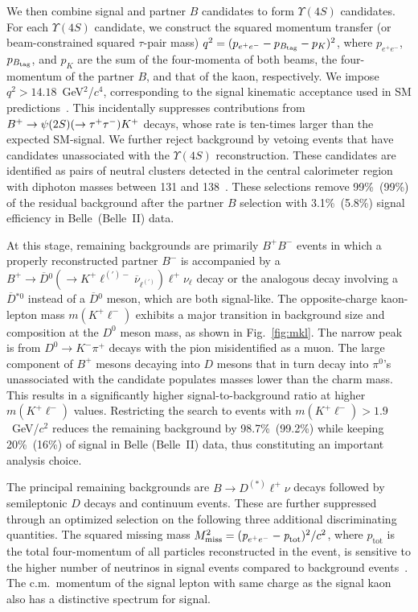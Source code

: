 We then combine signal and partner $B$ candidates to form $\Upsilon(4S)$ candidates. For each $\Upsilon(4S)$ candidate, we construct the squared momentum transfer (or beam-constrained squared $\tau$-pair mass) $q^2 = (p_{e^+e^-} - p_{B_{\rm tag}} -p_K)^2$, where $p_{{e^+e^-}}$, $p_{{ B_{\rm tag}}}$, and  $p_{{K}}$ are the sum of the four-momenta of both beams, the four-momentum of the partner $B$, and that of the kaon, respectively. We impose $q^2 > 14.18$~GeV$^2$/$c^4$, corresponding to the signal kinematic acceptance used in SM predictions~\cite{Bouchard:2013mia}. This incidentally suppresses  contributions from $B^+ \rightarrow \psi(2S) (\rightarrow \tau^+\tau^-) K^+$ decays, whose rate is ten-times larger than the expected SM-signal. We further reject background by vetoing events that have \piz candidates  unassociated with the $\Upsilon(4S)$ reconstruction. These candidates are identified as pairs of neutral clusters detected in the central calorimeter region with diphoton masses between 131 and 138~\mevcc. These selections remove 99\%~(99\%) of the residual background after the partner $B$ selection with 3.1\%~(5.8\%) signal efficiency in Belle~(Belle~II) data.


At this stage, remaining backgrounds are primarily $B^+B^-$ events in which a properly reconstructed partner $B^-$ is accompanied by a $B^+ \to \overline{D}{}^{0}(\to K^+ \ell^{(\prime)-} \overline{\nu}_{\ell^{(\prime)}}) \ell^{+} \nu_{\ell}$ decay or the analogous decay involving a $\overline{D}{}^{*0}$ instead of a $\overline{D}{}^{0}$ meson, which are both signal-like. The opposite-charge kaon-lepton mass $m(K^+\ell^-)$ exhibits a major transition in background size and composition at the $D^0$ meson mass, as shown in Fig.~\ref{fig:mkl}. The narrow peak is from $D^0 \to K^-\pi^+$ decays with the pion misidentified as a muon. The large component of $B^+$ mesons decaying into $D$ mesons that in turn decay into $\pi^{0}$'s unassociated with the candidate populates masses lower than the charm mass. This results in a significantly higher signal-to-background ratio at higher $m(K^+\ell^-)$ values. Restricting the search to events with $m(K^+\ell^-) > 1.9$~GeV/$c^2$ reduces the remaining background by 98.7\%~(99.2\%) while keeping 20\%~(16\%) of signal in Belle (Belle~II) data, thus constituting an important analysis choice.

The principal remaining backgrounds are $B \to D^{(\ast)} \ell^{+} \nu$ decays followed by semileptonic $D$ decays and continuum events.
These are further suppressed through an optimized selection on the following three additional discriminating quantities.
The squared missing mass $M_{\rm miss}^2= (\textit{p}_{e^+e^-} - \textit{p}_{\rm{tot}})^{2}/c^2$, where $p_{\text{tot}}$ is the total four-momentum of all particles reconstructed in the event, is sensitive to the higher number of neutrinos in signal events compared to background events~\cite{SuppMat}. The c.m.\ momentum \plcms of the signal lepton with same charge as the signal kaon also has a distinctive spectrum for signal.

